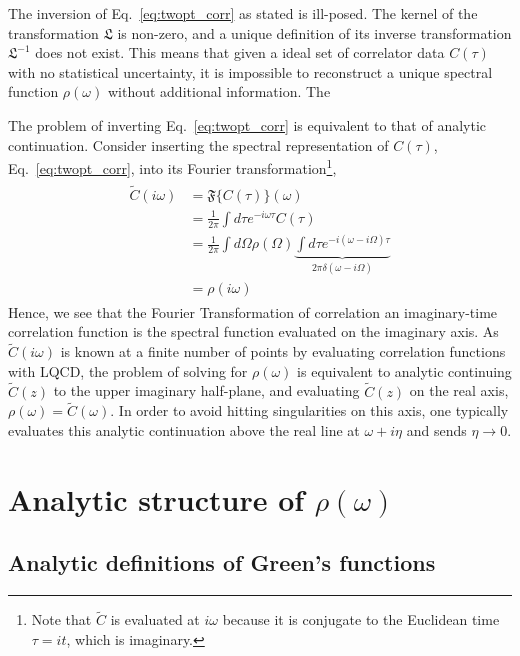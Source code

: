 The inversion of Eq.~\eqref{eq:twopt_corr} as stated is ill-posed. The kernel of the transformation $\mathfrak L$ is non-zero, and a unique definition of its inverse transformation $\mathfrak L^{-1}$ does not exist. This means that given a ideal set of correlator data $C(\tau)$ with no statistical uncertainty, it is impossible to reconstruct a unique spectral function $\rho(\omega)$ without additional information. The 

The problem of inverting Eq.~\eqref{eq:twopt_corr} is equivalent to that of analytic continuation. Consider inserting the spectral representation of $C(\tau)$, Eq.~\eqref{eq:twopt_corr}, into its Fourier transformation\footnote{Note that $\tilde C$ is evaluated at $i\omega$ because it is conjugate to the Euclidean time $\tau = it$, which is imaginary.},
\begin{align}\begin{split}
        \tilde C(i\omega) &= \mathfrak{F}\{C(\tau)\}(\omega)  \\
        &= \frac{1}{2\pi}\int d\tau e^{-i\omega\tau} C(\tau) \\
        &= \frac{1}{2\pi}\int d\Omega \rho(\Omega) \underbrace{\int d\tau e^{-i(\omega - i\Omega)\tau}}_{2\pi \delta(\omega - i\Omega)} \\
        &= \rho(i\omega)
\end{split}\end{align}
Hence, we see that the Fourier Transformation of correlation an imaginary-time correlation function is the spectral function evaluated on the imaginary axis. As $\tilde C(i\omega)$ is known at a finite number of points by evaluating correlation functions with LQCD, the problem of solving for $\rho(\omega)$ is equivalent to analytic continuing $\tilde C(z)$ to the upper imaginary half-plane, and evaluating $\tilde C(z)$ on the real axis, $\rho(\omega) = \tilde C(\omega)$. In order to avoid hitting singularities on this axis, one typically evaluates this analytic continuation above the real line at $\omega + i\eta$ and sends $\eta\rightarrow 0$.

\section{Analytic structure of $\rho(\omega)$}

\subsection{Analytic definitions of Green's functions}

